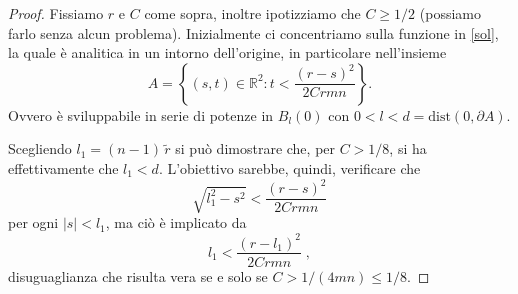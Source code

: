 \begin{proof}
Fissiamo $r$ e $C$ come sopra, inoltre ipotizziamo che $C\geq 1/2$ (possiamo farlo senza alcun problema). 
Inizialmente ci concentriamo sulla funzione in \eqref{sol}, la quale è analitica in un intorno dell'origine, in particolare nell'insieme 
$$A = \left\{ (s,t) \in \mathbb{R}^2 : t<\frac{(r-s)^2}{2Crmn} \right\} .$$
Ovvero è sviluppabile in serie di potenze in $B_l(0)$ con $0<l<d=\text{dist}(0, \partial A)$.
\begin{center}
\end{center}
Scegliendo $l_1 = (n-1)\,\widetilde{r}$ si può dimostrare che, per $C>1/8$, si ha effettivamente che $l_1<d$. L'obiettivo sarebbe, quindi, verificare che $$\sqrt{l_1^2-s^2} < \frac{(r-s)^2}{2Crmn}$$ per ogni $|s|<l_1$, ma ciò è implicato da 
\begin{equation} \label{l1}
l_1 < \frac{(r-l_1)^2}{2Crmn}\; ,
\end{equation}
disuguaglianza che risulta vera se e solo se $C > 1/(4mn) \leq 1/8$.


\end{proof}
